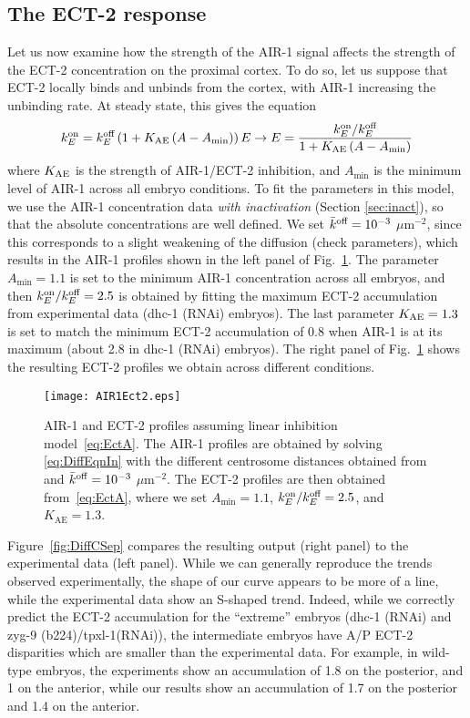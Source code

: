 \documentclass[11pt]{article}
\newcommand{\red}[1]{\color{red}#1\normalcolor}
\begin{document}
\subsection{The ECT-2 response}
Let us now examine how the strength of the AIR-1 signal affects the strength of the ECT-2 concentration on the proximal cortex. To do so, let us suppose that ECT-2 locally binds and unbinds from the cortex, with AIR-1 increasing the unbinding rate. At steady state, this gives the equation
\begin{equation}
\label{eq:EctA}
 k^\text{on}_E = k^\text{off}_E \left(1+K_\text{AE} \left(A-A_\text{min}\right)\right)E \rightarrow E = \frac{k^\text{on}_E/ k^\text{off}_E}{ 1+K_\text{AE} \left(A-A_\text{min}\right)}
\end{equation}
where $K_\text{AE}$ is the strength of AIR-1/ECT-2 inhibition, and $A_\text{min}$ is the minimum level of AIR-1 across all embryo conditions. To fit the parameters in this model, we use the AIR-1 concentration data \emph{with inactivation} (Section \ref{sec:inact}), so that the absolute concentrations are well defined. We set $\bar{k}^\text{off}=10^{-3}$ $\mu$m$^{-2}$, since this corresponds to a slight weakening of the diffusion \red{(check parameters)}, which results in the AIR-1 profiles shown in the left panel of Fig.\ \ref{fig:AIRECT}. The parameter $A_\text{min}=1.1$ is set to the minimum AIR-1 concentration across all embryos, and then $k^\text{on}_E/ k^\text{off}_E=2.5$ is obtained by fitting the maximum ECT-2 accumulation from experimental data (dhc-1 (RNAi) embryos). The last parameter $K_\text{AE}=1.3$ is set to match the minimum ECT-2 accumulation of 0.8 when AIR-1 is at its maximum (about 2.8 in dhc-1 (RNAi) embryos). The right panel of Fig.\ \ref{fig:AIRECT} shows the resulting ECT-2 profiles we obtain across different conditions. 

\begin{figure}
\centering
\texttt{[image: AIR1Ect2.eps]}
\caption{\label{fig:AIRECT}AIR-1 and ECT-2 profiles assuming linear inhibition model\ \eqref{eq:EctA}. The AIR-1 profiles are obtained by solving \eqref{eq:DiffEqnIn} with the different centrosome distances obtained from \cite{longhini2022aurora} and $\bar{k}^\text{off}=10^{-3}$ $\mu$m$^{-2}$. The ECT-2 profiles are then obtained from\ \eqref{eq:EctA}, where we set $A_\text{min}=1.1$, $k^\text{on}_E/k^\text{off}_E=2.5$, and $K_\text{AE}=1.3$. }
\end{figure}

Figure\ \ref{fig:DiffCSep} compares the resulting output (right panel) to the experimental data (left panel). While we can generally reproduce the trends observed experimentally, the shape of our curve appears to be more of a line, while the experimental data show an S-shaped trend. Indeed, while we correctly predict the ECT-2 accumulation for the ``extreme'' embryos (dhc-1 (RNAi) and zyg-9 (b224)/tpxl-1(RNAi)), the intermediate embryos have A/P ECT-2 disparities which are smaller than the experimental data. For example, in wild-type embryos, the experiments show an accumulation of 1.8 on the posterior, and 1 on the anterior, while our results show an accumulation of 1.7 on the posterior and 1.4 on the anterior. 
\end{document}
